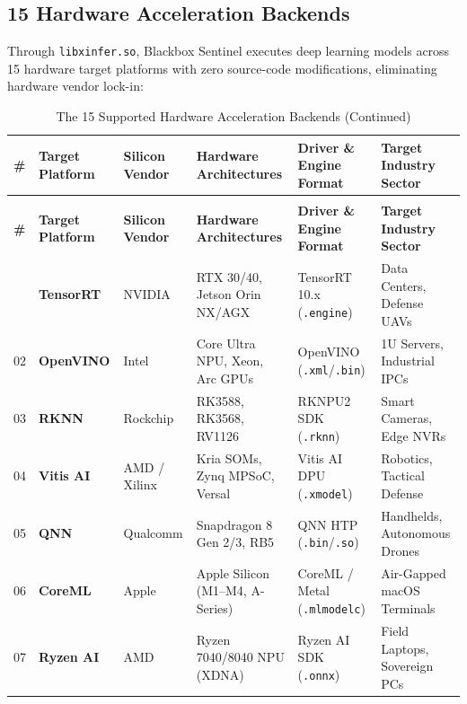 \documentclass[11pt,a4paper]{article}
\begin{document}
\subsection{15 Hardware Acceleration Backends}
Through \texttt{libxinfer.so}, Blackbox Sentinel executes deep learning models across 15 hardware target platforms with zero source-code modifications, eliminating hardware vendor lock-in:

\setlength{\tabcolsep}{3pt}
\begin{footnotesize}
\begin{longtable}{@{}p{} p{} p{} p{} p{} p{}@{}}
\caption{The 15 Supported Hardware Acceleration Backends in Blackbox Sentinel} \label{tab:hardware} \\
\toprule
\textbf{\#} & \textbf{Target Platform} & \textbf{Silicon Vendor} & \textbf{Hardware Architectures} & \textbf{Driver \& Engine Format} & \textbf{Target Industry Sector} \\ \midrule
\endfirsthead
\caption[]{The 15 Supported Hardware Acceleration Backends (Continued)} \\
\toprule
\textbf{\#} & \textbf{Target Platform} & \textbf{Silicon Vendor} & \textbf{Hardware Architectures} & \textbf{Driver \& Engine Format} & \textbf{Target Industry Sector} \\ \midrule
\endhead
\bottomrule
\endfoot
01 & \textbf{TensorRT} & NVIDIA & RTX 30/40, Jetson Orin NX/AGX & TensorRT 10.x (\texttt{.engine}) & Data Centers, Defense UAVs \\
02 & \textbf{OpenVINO} & Intel & Core Ultra NPU, Xeon, Arc GPUs & OpenVINO (\texttt{.xml}/\texttt{.bin}) & 1U Servers, Industrial IPCs \\
03 & \textbf{RKNN} & Rockchip & RK3588, RK3568, RV1126 & RKNPU2 SDK (\texttt{.rknn}) & Smart Cameras, Edge NVRs \\
04 & \textbf{Vitis AI} & AMD / Xilinx & Kria SOMs, Zynq MPSoC, Versal & Vitis AI DPU (\texttt{.xmodel}) & Robotics, Tactical Defense \\
05 & \textbf{QNN} & Qualcomm & Snapdragon 8 Gen 2/3, RB5 & QNN HTP (\texttt{.bin}/\texttt{.so}) & Handhelds, Autonomous Drones \\
06 & \textbf{CoreML} & Apple & Apple Silicon (M1--M4, A-Series) & CoreML / Metal (\texttt{.mlmodelc}) & Air-Gapped macOS Terminals \\
07 & \textbf{Ryzen AI} & AMD & Ryzen 7040/8040 NPU (XDNA) & Ryzen AI SDK (\texttt{.onnx}) & Field Laptops, Sovereign PCs \\

\end{longtable}
\end{footnotesize}
\end{document}
